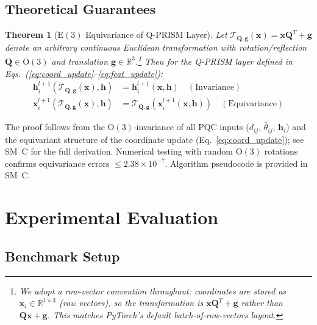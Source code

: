 \documentclass[10pt,twocolumn,letterpaper]{article}
\newtheorem{theorem}{Theorem}
\begin{document}
\subsection{Theoretical Guarantees}
\label{sec:theory}

\begin{theorem}[$\mathrm{E}(3)$ Equivariance of Q-PRISM Layer]
\label{thm:equivariance}
Let $\mathcal{T}_{\mathbf{Q}, \mathbf{g}}(\mathbf{x}) = \mathbf{x} \mathbf{Q}^T + \mathbf{g}$ denote an arbitrary continuous Euclidean transformation with rotation/reflection $\mathbf{Q} \in \mathrm{O}(3)$ and translation $\mathbf{g} \in \mathbb{R}^3$.\footnote{We adopt a row-vector convention throughout: coordinates are stored as $\mathbf{x}_i \in \mathbb{R}^{1 \times 3}$ (row vectors), so the transformation is $\mathbf{x} \mathbf{Q}^T + \mathbf{g}$ rather than $\mathbf{Q}\mathbf{x} + \mathbf{g}$. This matches PyTorch's default batch-of-row-vectors layout.} Then for the Q-PRISM layer defined in Eqs.~(\ref{eq:coord_update}--\ref{eq:feat_update}):
\begin{align}
    \mathbf{h}_i^{l+1}(\mathcal{T}_{\mathbf{Q}, \mathbf{g}}(\mathbf{x}), \mathbf{h}) &= \mathbf{h}_i^{l+1}(\mathbf{x}, \mathbf{h}) \quad (\text{Invariance}) \\
    \mathbf{x}_i^{l+1}(\mathcal{T}_{\mathbf{Q}, \mathbf{g}}(\mathbf{x}), \mathbf{h}) &= \mathcal{T}_{\mathbf{Q}, \mathbf{g}}(\mathbf{x}_i^{l+1}(\mathbf{x}, \mathbf{h})) \quad (\text{Equivariance})
\end{align}
\end{theorem}

The proof follows from the $\mathrm{O}(3)$-invariance of all PQC inputs ($d_{ij}$, $\bar{\theta}_{ij}$, $\mathbf{h}_i$) and the equivariant structure of the coordinate update (Eq.~\ref{eq:coord_update}); see SM~C for the full derivation. Numerical testing with random $\mathrm{O}(3)$ rotations confirms equivariance errors $\le 2.38 \times 10^{-7}$. Algorithm pseudocode is provided in SM~C.

\section{Experimental Evaluation}
\label{sec:experiments}

\subsection{Benchmark Setup}
\end{document}
